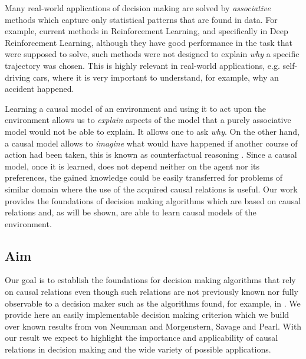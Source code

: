 \documentclass[review]{elsarticle}
\begin{document}
Many real-world applications of decision making are solved by \textit{associative} methods which capture only statistical patterns that are found in data. For example, current methods in Reinforcement Learning, and specifically in Deep Reinforcement Learning, although they have good performance in the task that were supposed to solve, such methods were not designed to explain \textit{why} a specific trajectory was chosen. This is highly relevant in real-world applications, e.g. self-driving cars, where it is very important to understand, for example, why an accident happened. 
	
Learning a causal model of an environment and using it to act upon the environment allows us to \textit{explain} aspects of the model that a purely associative model would not be able to explain. It allows one to ask \textit{why}. On the other hand, a causal model allows to \textit{imagine} what would have happened if another course of action had been taken, this is known as counterfactual reasoning \citep{pearl2018why}. Since a causal model, once it is learned, does not depend neither on the agent nor its preferences, the gained knowledge could be easily transferred for problems of similar domain where the use of the acquired causal relations is useful. Our work provides the foundations of decision making algorithms which are based on causal relations and, as will be shown, are able to learn causal models of the environment.

\subsection{Aim}
Our goal is to establish the foundations for decision making algorithms that rely on causal relations even though such relations are not previously known nor fully observable to a decision maker such as the algorithms found, for example, in \citep{bareinboim2015bandits,lattimoreNIPS2016,sen2017identifying,gonzalez2018playing}. We provide here an easily implementable decision making criterion which we build over known results from von Neumman and Morgenstern, Savage and Pearl. With our result we expect to highlight the importance and applicability of causal relations in decision making and the wide variety of possible applications.
\end{document}

